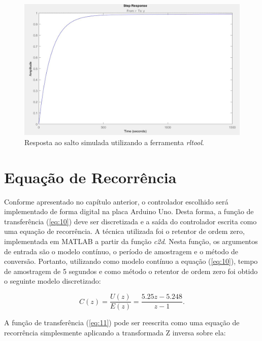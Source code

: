 \begin{figure}[htb]
	\caption{\label{StepResponse}Resposta ao salto simulada utilizando a ferramenta \textit{rltool}.}
	\begin{center}
	    \includegraphics[width=0.85\linewidth]{./img/StepResponse.jpg}
	\end{center}
\end{figure}

		\section{Equação de Recorrência}
Conforme apresentado no capítulo anterior, o controlador escolhido será implementado de forma digital na placa Arduino Uno. Desta forma, a função de transferência (\ref{eq:10}) deve ser discretizada e a saída do controlador escrita como uma equação de recorrência. A técnica utilizada foi o retentor de ordem zero, implementada em MATLAB a partir da função \textit{c2d}. Nesta função, os argumentos de entrada são o modelo contínuo, o período de amostragem e o método de conversão. Portanto, utilizando como modelo contínuo a equação (\ref{eq:10}), tempo de amostragem de 5 segundos e como método o retentor de ordem zero foi obtido o seguinte modelo discretizado:

\begin{equation}
	\label{eq:11}
	C(z)=\frac{U(z)}{E(z)} =\frac{5.25z-5.248}{z-1}.
\end{equation}

A função de transferência (\ref{eq:11}) pode ser reescrita como uma equação de recorrência simplesmente aplicando a transformada Z inversa sobre ela: 

